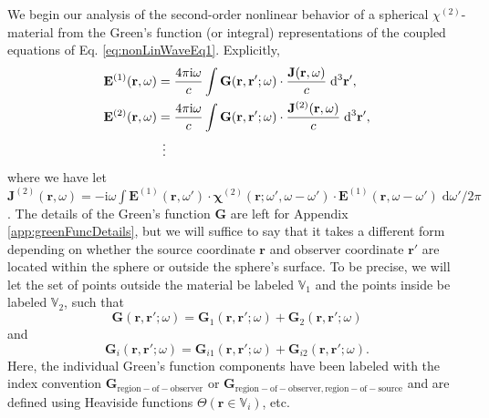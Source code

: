 \documentclass{article}
\begin{document}
We begin our analysis of the second-order nonlinear behavior of a spherical $\chi^{(2)}$-material from the Green's function (or integral) representations of the coupled equations of Eq. \eqref{eq:nonLinWaveEq1}. Explicitly,
\begin{equation}
\begin{split}
\mathbf{E}^{(1)}(\mathbf{r},\omega) &= \frac{4\pi\mathrm{i}\omega}{c}\int\mathbf{G}(\mathbf{r},\mathbf{r}';\omega)\cdot\frac{\mathbf{J}(\mathbf{r},\omega)}{c}\;\mathrm{d}^3\mathbf{r}',\\
\mathbf{E}^{(2)}(\mathbf{r},\omega) &= \frac{4\pi\mathrm{i}\omega}{c}\int\mathbf{G}(\mathbf{r},\mathbf{r}';\omega)\cdot\frac{\mathbf{J}^{(2)}(\mathbf{r},\omega)}{c}\;\mathrm{d}^3\mathbf{r}',\\
&\hspace{0.0125\textwidth}\vdots
\end{split}
\end{equation}
where we have let $\mathbf{J}^{(2)}(\mathbf{r},\omega) = -\mathrm{i}\omega\int\mathbf{E}^{(1)}(\mathbf{r},\omega')\cdot\bm{\chi}^{(2)}(\mathbf{r};\omega',\omega - \omega')\cdot\mathbf{E}^{(1)}(\mathbf{r},\omega - \omega')\;\mathrm{d}\omega'/2\pi$. The details of the Green's function $\mathbf{G}$ are left for Appendix \ref{app:greenFuncDetails}, but we will suffice to say that it takes a different form depending on whether the source coordinate $\mathbf{r}$ and observer coordinate $\mathbf{r}'$ are located within the sphere or outside the sphere's surface. To be precise, we will let the set of points outside the material be labeled $\mathbb{V}_1$ and the points inside be labeled $\mathbb{V}_2$, such that
\begin{equation}
\mathbf{G}(\mathbf{r},\mathbf{r}';\omega) = \mathbf{G}_1(\mathbf{r},\mathbf{r}';\omega) + \mathbf{G}_2(\mathbf{r},\mathbf{r}';\omega)
\end{equation}
and
\begin{equation}
\mathbf{G}_{i}(\mathbf{r},\mathbf{r}';\omega) = \mathbf{G}_{i1}(\mathbf{r},\mathbf{r}';\omega) + \mathbf{G}_{i2}(\mathbf{r},\mathbf{r}';\omega).
\end{equation}
Here, the individual Green's function components have been labeled with the index convention $\mathbf{G}_\mathrm{region-of-observer}$ or $\mathbf{G}_\mathrm{region-of-observer,region-of-source}$ and are defined using Heaviside functions $\Theta(\mathbf{r}\in\mathbb{V}_i)$, etc.
\end{document}
